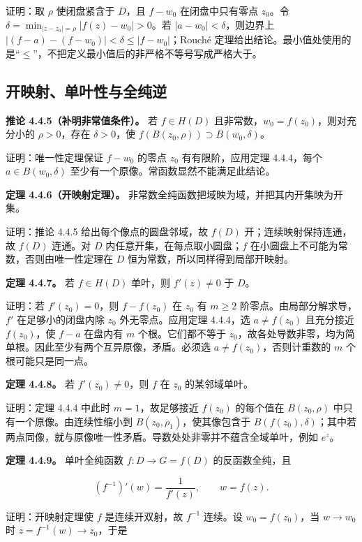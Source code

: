 \documentclass[11pt,a4paper]{article}
\begin{document}
证明：取 \(\rho\) 使闭盘紧含于 \(D\)，且 \(f-w_0\) 在闭盘中只有零点
\(z_0\)。令 \(\delta=\min_{|z-z_0|=\rho}|f(z)-w_0|>0\)。若
\(|a-w_0|<\delta\)，则边界上
\(|(f-a)-(f-w_0)|<\delta\le|f-w_0|\)；Rouché
定理给出结论。最小值处使用的是``\(\le\)''，不把定义最小值后的非严格不等号写成严格大于。

\subsection{开映射、单叶性与全纯逆}\label{ch04-s4-heading-4}

\textbf{推论 4.4.5（补明非常值条件）。} 若 \(f\in H(D)\)
且非常数，\(w_0=f(z_0)\)，则对充分小的 \(\rho>0\)，存在 \(\delta>0\)，使
\(f(B(z_0,\rho))\supset B(w_0,\delta)\)。

证明：唯一性定理保证 \(f-w_0\) 的零点 \(z_0\) 有有限阶，应用定理
4.4.4，每个 \(a\in B(w_0,\delta)\)
至少有一个原像。常函数显然不能满足此结论。

\textbf{定理 4.4.6（开映射定理）。}
非常数全纯函数把域映为域，并把其内开集映为开集。

证明：推论 4.4.5 给出每个像点的圆盘邻域，故 \(f(D)\)
开；连续映射保持连通，故 \(f(D)\) 连通。对 \(D\)
内任意开集，在每点取小圆盘；\(f\)
在小圆盘上不可能为常数，否则由唯一性定理在 \(D\)
恒为常数，所以同样得到局部开映射。

\textbf{定理 4.4.7。} 若 \(f\in H(D)\) 单叶，则 \(f'(z)\ne0\) 于 \(D\)。

证明：若 \(f'(z_0)=0\)，则 \(f-f(z_0)\) 在 \(z_0\) 有 \(m\ge2\)
阶零点。由局部分解求导，\(f'\) 在足够小的闭盘内除 \(z_0\)
外无零点。应用定理 4.4.4，选 \(a\ne f(z_0)\) 且充分接近 \(f(z_0)\)，使
\(f-a\) 在盘内有 \(m\) 个根。它们都不等于
\(z_0\)，故各处导数非零，均为简单根。因此至少有两个互异原像，矛盾。必须选
\(a\ne f(z_0)\)，否则计重数的 \(m\) 个根可能只是同一点。

\textbf{定理 4.4.8。} 若 \(f'(z_0)\ne0\)，则 \(f\) 在 \(z_0\)
的某邻域单叶。

证明：定理 4.4.4 中此时 \(m=1\)，故足够接近 \(f(z_0)\) 的每个值在
\(B(z_0,\rho)\) 中只有一个原像。由连续性缩小到
\(B(z_0,\rho_1)\)，使其像包含于
\(B(f(z_0),\delta)\)；其中若两点同像，就与原像唯一性矛盾。导数处处非零并不蕴含全域单叶，例如
\(e^z\)。

\textbf{定理 4.4.9。} 单叶全纯函数 \(f:D\to G=f(D)\) 的反函数全纯，且

\[
(f^{-1})'(w)=\frac1{f'(z)},\qquad w=f(z).
\]

证明：开映射定理使 \(f\) 是连续开双射，故 \(f^{-1}\) 连续。设
\(w_0=f(z_0)\)，当 \(w\to w_0\) 时 \(z=f^{-1}(w)\to z_0\)，于是
\end{document}

